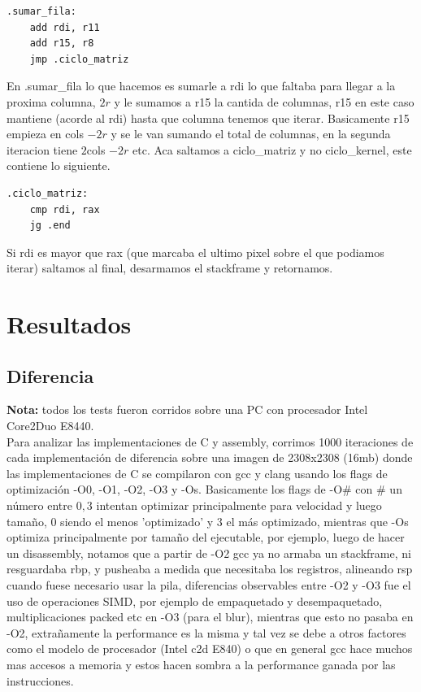 \documentclass[a4paper]{article}
\begin{document}
\begin{codesnippet}
\begin{verbatim}
.sumar_fila:
    add rdi, r11                 
    add r15, r8                    
    jmp .ciclo_matriz
\end{verbatim}
\end{codesnippet}

 En .sumar\_fila lo que hacemos es sumarle a rdi lo que faltaba para llegar a la proxima columna, $2r$ y le sumamos a r15 la cantida de columnas, r15 en este caso mantiene (acorde al rdi) hasta que columna tenemos que iterar. Basicamente r15 empieza en cols $-2r$ y se le van sumando el total de columnas, en la segunda iteracion tiene $2$cols $-2r$ etc. Aca saltamos a ciclo\_matriz y no ciclo\_kernel, este contiene lo siguiente.

\begin{codesnippet}
\begin{verbatim}
.ciclo_matriz:
    cmp rdi, rax                       
    jg .end
\end{verbatim}
\end{codesnippet}

 Si rdi es mayor que rax (que marcaba el ultimo pixel sobre el que podiamos iterar) saltamos al final, desarmamos el stackframe y retornamos.

\section{Resultados}

\subsection{Diferencia}

\noindent \textbf{Nota:} todos los tests fueron corridos sobre una PC con procesador Intel Core2Duo E8440.
\\
\newline
 Para analizar las implementaciones de C y assembly, corrimos 1000 iteraciones de cada implementación de diferencia sobre una imagen de 2308x2308 (16mb) donde las implementaciones de C se compilaron con gcc y clang usando los flags de optimización -O0, -O1, -O2, -O3 y -Os. Basicamente los flags de -O\# con \# un número entre $0,3$ intentan optimizar principalmente para velocidad y luego tamaño, $0$ siendo el menos 'optimizado' y $3$ el más optimizado, mientras que -Os optimiza principalmente por tamaño del ejecutable, por ejemplo, luego de hacer un disassembly, notamos que a partir de -O2 gcc ya no armaba un stackframe, ni resguardaba rbp, y pusheaba a medida que necesitaba los registros, alineando rsp cuando fuese necesario usar la pila, diferencias observables entre -O2 y -O3 fue el uso de operaciones SIMD, por ejemplo de empaquetado y desempaquetado, multiplicaciones packed etc en -O3 (para el blur), mientras que esto no pasaba en -O2, extrañamente la performance es la misma y tal vez se debe a otros factores como el modelo de procesador (Intel c2d E840) o que en general gcc hace muchos mas accesos a memoria y estos hacen sombra a la performance ganada por las instrucciones. \newline
\end{document}
